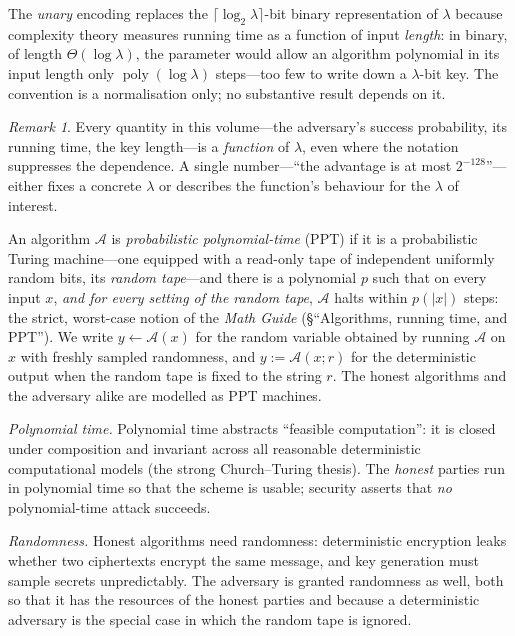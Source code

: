 \documentclass[11pt,a4paper]{article}
\theoremstyle{definition}
\theoremstyle{remark}
\newtheorem{remark}[theorem]{Remark}
\DeclareMathOperator{\poly}{poly}
\begin{document}
The \emph{unary} encoding replaces the
\(\lceil \log_2 \lambda \rceil\)-bit binary representation of
\(\lambda\) because complexity theory measures running time as a
function of input \emph{length}: in binary, of length
\(\Theta(\log \lambda)\), the parameter would allow an algorithm
polynomial in its input length only \(\poly(\log \lambda)\)
steps---too few to write down a \(\lambda\)-bit key. The convention is
a normalisation only; no substantive result depends on it.

\begin{remark}\label{model:rem:everything-asymptotic}
Every quantity in this volume---the adversary's success probability,
its running time, the key length---is a \emph{function} of
\(\lambda\), even where the notation suppresses the dependence. A
single number---``the advantage is at most \(2^{-128}\)''---either
fixes a concrete \(\lambda\) or describes the function's behaviour for
the \(\lambda\) of interest.
\end{remark}

An algorithm \(\mathcal{A}\) is \emph{probabilistic polynomial-time}
(PPT) if it is a probabilistic Turing machine---one equipped with a
read-only tape of independent uniformly random bits, its \emph{random
tape}---and there is a polynomial \(p\) such that on every input
\(x\), \emph{and for every setting of the random tape}, \(\mathcal{A}\)
halts within \(p(|x|)\) steps: the strict, worst-case notion of the
\emph{Math Guide} (\S``Algorithms, running time, and PPT''). We write
\(y \gets \mathcal{A}(x)\) for the random variable obtained by running
\(\mathcal{A}\) on \(x\) with freshly sampled randomness, and
\(y := \mathcal{A}(x; r)\) for the deterministic output when the
random tape is fixed to the string \(r\). The honest
algorithms and the adversary alike are modelled as PPT machines.

\emph{Polynomial time.} Polynomial time abstracts ``feasible
computation'': it is closed under composition and invariant across all
reasonable deterministic computational models (the strong
Church--Turing thesis). The \emph{honest} parties run in polynomial
time so that the scheme is usable; security asserts that \emph{no}
polynomial-time attack succeeds.

\emph{Randomness.} Honest algorithms need randomness: deterministic
encryption leaks whether two ciphertexts encrypt the same message, and
key generation must sample secrets unpredictably. The adversary is
granted randomness as well, both so that it has the resources of the
honest parties and because a deterministic adversary is the special
case in which the random tape is ignored.
\end{document}
